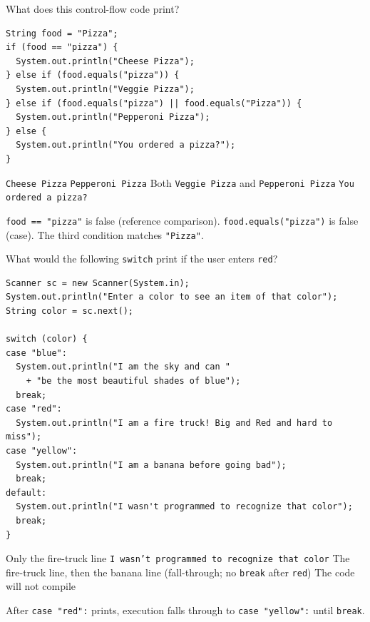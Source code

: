 \question[4]
What does this control-flow code print?
\begin{lstlisting}[style=java]
String food = "Pizza";
if (food == "pizza") {
  System.out.println("Cheese Pizza");
} else if (food.equals("pizza")) {
  System.out.println("Veggie Pizza");
} else if (food.equals("pizza") || food.equals("Pizza")) {
  System.out.println("Pepperoni Pizza");
} else {
  System.out.println("You ordered a pizza?");
}
\end{lstlisting}
\begin{choices}
  \choice \texttt{Cheese Pizza}
  \CorrectChoice \texttt{Pepperoni Pizza}
  \choice Both \texttt{Veggie Pizza} and \texttt{Pepperoni Pizza}
  \choice \texttt{You ordered a pizza?}
\end{choices}
\begin{solution}
  \texttt{food == "pizza"} is false (reference comparison). \texttt{food.equals("pizza")} is false (case). The third condition matches \texttt{"Pizza"}.
\end{solution}

\newpage

\question[4]
What would the following \texttt{switch} print if the user enters \texttt{red}?
\begin{lstlisting}[style=java]
Scanner sc = new Scanner(System.in);
System.out.println("Enter a color to see an item of that color");
String color = sc.next();

switch (color) {
case "blue":
  System.out.println("I am the sky and can "
    + "be the most beautiful shades of blue");
  break;
case "red":
  System.out.println("I am a fire truck! Big and Red and hard to miss");
case "yellow":
  System.out.println("I am a banana before going bad");
  break;
default:
  System.out.println("I wasn't programmed to recognize that color");
  break;
}
\end{lstlisting}
\begin{choices}
  \choice Only the fire-truck line
  \choice \texttt{I wasn't programmed to recognize that color}
  \CorrectChoice The fire-truck line, then the banana line (fall-through; no \texttt{break} after \texttt{red})
  \choice The code will not compile
\end{choices}
\begin{solution}
  After \texttt{case "red":} prints, execution falls through to \texttt{case "yellow":} until \texttt{break}.
\end{solution}


